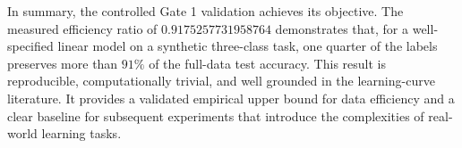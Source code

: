 \documentclass[10pt]{article}
\begin{document}
In summary, the controlled Gate 1 validation achieves its objective. The measured efficiency ratio of \(0.9175257731958764\) demonstrates that, for a well-specified linear model on a synthetic three-class task, one quarter of the labels preserves more than \(91\%\) of the full-data test accuracy. This result is reproducible, computationally trivial, and well grounded in the learning-curve literature. It provides a validated empirical upper bound for data efficiency and a clear baseline for subsequent experiments that introduce the complexities of real-world learning tasks.
\end{document}
